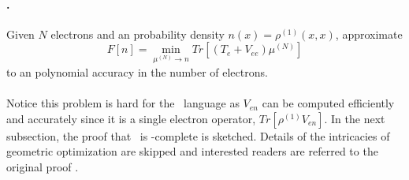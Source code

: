 \documentclass[11pt,oneside,final]{huthesis}%
\begin{document}
\paragraph{\UF.} Given $N$ electrons and an probability density $n(x)= \rho^{(1)} (x,x)$, approximate $$F[n]=\min_{\mu^{(N)}\rightarrow n} Tr[(T_e+V_{ee})\mu^{(N)}]$$ to an polynomial accuracy in the number of electrons.

\paragraph*{}
Notice this problem is hard for the \ES~language as $V_{en}$ can be computed efficiently and accurately since it is a single electron operator, $Tr[\rho^{(1)}V_{en}]$.  In the next subsection, the proof that \REP~is \qma-complete is sketched.  Details of the intricacies of geometric optimization are skipped and interested readers are referred to the original proof \cite{Lui07}.
\end{document}
